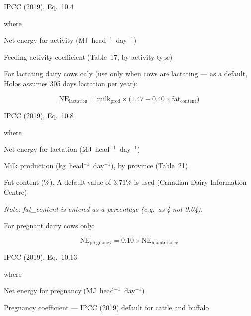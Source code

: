 \noindent IPCC (2019), Eq.~10.4

\noindent where
\begin{description}[font=\normalfont, leftmargin=9em, style=sameline, nosep]
    \item[$\mathrm{NE}_{\mathrm{activity}}$] Net energy for activity
          (MJ~head$^{-1}$~day$^{-1}$)
    \item[$C_a$] Feeding activity coefficient (Table~17, by activity type)
\end{description}

\noindent For lactating dairy cows only (use only when cows are lactating --- as a
default, Holos assumes 305 days lactation per year):

\begin{equation}
    \mathrm{NE}_{\mathrm{lactation}} =
        \mathrm{milk}_{\mathrm{prod}} \times
        \bigl(1.47 + 0.40 \times \mathrm{fat}_{\mathrm{content}}\bigr)
    \tag{Eq.\ 3.2.1.4}
\end{equation}

\noindent IPCC (2019), Eq.~10.8

\noindent where
\begin{description}[font=\normalfont, leftmargin=9em, style=sameline, nosep]
    \item[$\mathrm{NE}_{\mathrm{lactation}}$] Net energy for lactation
          (MJ~head$^{-1}$~day$^{-1}$)
    \item[$\mathrm{milk}_{\mathrm{prod}}$] Milk production (kg~head$^{-1}$~day$^{-1}$),
          by province (Table~21)
    \item[$\mathrm{fat}_{\mathrm{content}}$] Fat content (\%). A default value of 3.71\%
          is used (Canadian Dairy Information Centre)
\end{description}

\noindent\textit{Note: fat\_content is entered as a percentage (e.g.\ as 4 not 0.04).}

\noindent For pregnant dairy cows only:

\begin{equation}
    \mathrm{NE}_{\mathrm{pregnancy}} = 0.10 \times \mathrm{NE}_{\mathrm{maintenance}}
    \tag{Eq.\ 3.2.1.5}
\end{equation}

\noindent IPCC (2019), Eq.~10.13

\noindent where
\begin{description}[font=\normalfont, leftmargin=9em, style=sameline, nosep]
    \item[$\mathrm{NE}_{\mathrm{pregnancy}}$] Net energy for pregnancy
          (MJ~head$^{-1}$~day$^{-1}$)
    \item[$0.1$] Pregnancy coefficient --- IPCC (2019) default for cattle and buffalo
\end{description}

